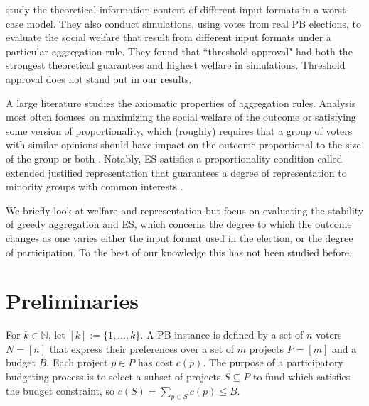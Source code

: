 \documentclass[twoside,11pt]{article}
\newcommand{\kibitz}[2]{\ifnum\Comments=1{\color{#1}{#2}}\fi}
\newcommand{\rf}[1]{\kibitz{blue}{[Roy says:#1]}}
\newcommand{\gb}[1]{\kibitz{red}{[GB:#1]}}
\newcommand{\mes}{ES}
\begin{document}
  study the theoretical information content of different input formats in a worst-case model.
They also conduct simulations, using votes from real PB elections,  to evaluate the social welfare that result from different input formats under a particular aggregation rule. They found that ``threshold approval" had both the strongest theoretical guarantees and highest welfare in simulations. 
Threshold approval does not stand out in our results.

A large literature studies the axiomatic properties of aggregation rules. Analysis most often focuses on maximizing the social welfare of the outcome \cite{benade2021preference,goel2019knapsack,jain2020participatory,hershkowitz2021district,talmon2019framework} %
or satisfying some version of proportionality, which (roughly) requires that a group of voters  with similar opinions should have impact on the outcome proportional to the size of the group \cite{fain2016core,aziz2017justified,sanchez2017proportional,fain2018fair,aziz2018proportionally,skowron2020participatory,peters2021proportional} or both \cite{fairstein2022welfare,michorzewski2020price}.  Notably, \mes{} satisfies a proportionality condition called extended justified representation that guarantees a degree of representation to minority groups with common interests \cite{PS20}. 

We briefly look at welfare and representation but focus on evaluating  the stability of greedy aggregation and \mes{}, which  concerns the degree to which the outcome changes as one varies either the input format used in the election, or the degree of participation.  To the best of our knowledge this has not been studied before. 

\gb{todo stability link to  manipulatbility}\rf{I assume you mean link between responsiveness and manipulability}




\section{Preliminaries}\label{sec:prem}

For   $k\in \mathbb{N}$,  let $[k] := \{1,\ldots,k\}$. A PB instance is defined by a set of $n$ voters $N=[n]$ that express their preferences over a set of $m$  projects $P=[m]$ and a budget $B$. 
Each project  $p\in P$ has cost   $c(p)$. 
The purpose  of  a participatory budgeting process  is to select  a subset of projects $S\subseteq P$  to fund which satisfies the budget constraint, so $c(S) =  \sum_{p\in S} c(p) \leq B$. 
\end{document}
